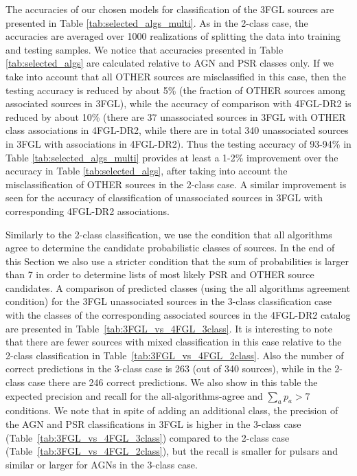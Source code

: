 \documentclass{aa}
\begin{document}
The accuracies of our chosen models for classification of the 3FGL sources are presented in Table \ref{tab:selected_algs_multi}.
As in the 2-class case, the accuracies are averaged over 1000 realizations of splitting the data into training and testing samples.
We notice that accuracies presented in Table \ref{tab:selected_algs} are calculated relative to AGN and PSR classes only. If we take into account that all OTHER sources
are misclassified in this case, then the testing accuracy is reduced by about 5\% (the fraction of OTHER sources among associated sources in 3FGL),
while the accuracy of comparison with 4FGL-DR2 is reduced by about 10\% (there are 37 unassociated sources in 3FGL with OTHER class associations in 4FGL-DR2,
while there are in total 340 unassociated sources in 3FGL with associations in 4FGL-DR2).
Thus the testing accuracy of 93-94\% in Table \ref{tab:selected_algs_multi} provides at least a 1-2\% improvement over the accuracy in Table \ref{tab:selected_algs},
after taking into account the misclassification of OTHER sources in the 2-class case.
A similar improvement is seen for the accuracy of classification of unassociated sources in 3FGL with corresponding 4FGL-DR2 associations.

Similarly to the 2-class classification, we use the condition that all algorithms agree to determine the candidate probabilistic classes of sources.
In the end of this Section we also use a stricter condition that the sum of probabilities is larger than 7 in order to determine lists of most likely PSR and OTHER source candidates.
A comparison of predicted classes (using the all algorithms agreement condition) for the 3FGL unassociated sources in the 3-class classification case with the classes of the corresponding associated sources in the 4FGL-DR2 catalog are presented in Table~\ref{tab:3FGL_vs_4FGL_3class}.
It is interesting to note that there are fewer sources with mixed classification in this case relative to the 2-class classification in 
Table~\ref{tab:3FGL_vs_4FGL_2class}.
Also the number of correct predictions in the 3-class case is 263 (out of 340 sources), while in the 2-class case there are 246 correct predictions.
We also show in this table the expected precision and recall for the all-algorithms-agree and $\sum_a p_a > 7$
conditions.
We note that in spite of adding an additional class, the precision of the AGN and PSR classifications in 3FGL
is higher in the 3-class case (Table~\ref{tab:3FGL_vs_4FGL_3class}) compared to the 2-class case
(Table~\ref{tab:3FGL_vs_4FGL_2class}), but the recall is smaller for pulsars and similar or larger for AGNs in the 3-class case.
\end{document}
